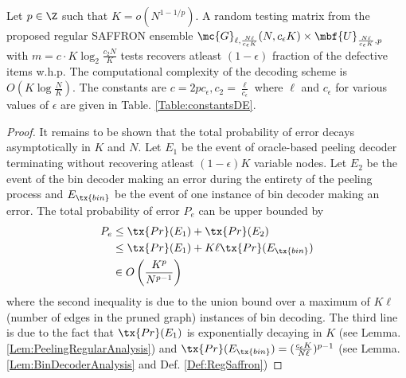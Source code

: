 \documentclass[conference,twocolumn]{IEEEtran}
\def\ceps{c_{\epsilon}}
\def\proofgap{-3ex}
\begin{document}
{\begin{theorem}
\label{Thm:NoiselessMain}
Let $p\in\Z$ such that $K=o(N^{1-1/p})$. A random testing matrix from the proposed regular SAFFRON ensemble $\mc{G}_{\ell,\frac{N\ell}{\ceps K}}(N,\ceps K)\times \mbf{U}_{\frac{N\ell}{\ceps K},p}$ with $m=c\cdot K\log_{2}\frac{c_2 N}{K}$ tests recovers atleast $(1-\epsilon)$ fraction of the defective items w.h.p. The computational complexity of the decoding scheme is $O(K\log \frac{N}{K})$. The constants are $c=2p\ceps, c_2=\frac{\ell}{\ceps}$ where $\ell$ and $\ceps$ for various values of $\epsilon$ are given in Table. \ref{Table:constantsDE}.%
\end{theorem}
\vspace{\proofgap}
\begin{proof}
It remains to be shown that the total probability of error decays asymptotically in $K$ and $N$. Let $E_1$ be the event of oracle-based peeling decoder terminating without recovering atleast $(1-\epsilon)K$ variable nodes. Let $E_2$ be the event of the bin decoder making an error during the entirety of the peeling process and $E_{\tx{bin}}$ be the event of one instance of bin decoder making an error. The total probability of error $P_e$ can be upper bounded by
\begin{align*}
P_e &\leq \tx{Pr}(E_1)+ \tx{Pr}(E_2)\\
               &\leq \tx{Pr}(E_1)+ K\ell\tx{ Pr}(E_{\tx{bin}})\\
               &\in O\left(\frac{K^{p}}{N^{p-1}}\right)
\end{align*}
where the second inequality is due to the union bound over a maximum of $K\ell$ (number of edges in the pruned graph) instances of bin decoding. The third line is due to the fact that $\tx{Pr}(E_1)$ is exponentially decaying in $K$ (see Lemma. \ref{Lem:PeelingRegularAnalysis}) and $\tx{Pr}(E_{\tx{bin}})=(\frac{\ceps K}{N\ell})^{p-1}$ (see Lemma. \ref{Lem:BinDecoderAnalysis} and Def. \ref{Def:RegSaffron})
\end{proof}

}
\end{document}
